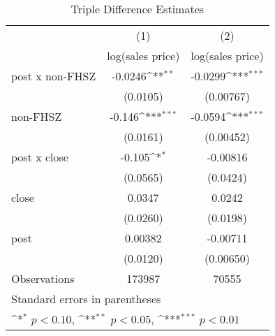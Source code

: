 \begin{table}[htbp]\centering
\def\sym#1{\ifmmode^{#1}\else\(^{#1}\)\fi}
\caption{Triple Difference Estimates\label{tabl}}
\begin{tabular}{l*{2}{c}}
\hline\hline
                    &\multicolumn{1}{c}{(1)}&\multicolumn{1}{c}{(2)}\\
                    &\multicolumn{1}{c}{log(sales price)}&\multicolumn{1}{c}{log(sales price)}\\
\hline
post x non-FHSZ     &     -0.0246\sym{**} &     -0.0299\sym{***}\\
                    &    (0.0105)         &   (0.00767)         \\
[1em]
non-FHSZ            &      -0.146\sym{***}&     -0.0594\sym{***}\\
                    &    (0.0161)         &   (0.00452)         \\
[1em]
post x close        &      -0.105\sym{*}  &    -0.00816         \\
                    &    (0.0565)         &    (0.0424)         \\
[1em]
close               &      0.0347         &      0.0242         \\
                    &    (0.0260)         &    (0.0198)         \\
[1em]
post                &     0.00382         &    -0.00711         \\
                    &    (0.0120)         &   (0.00650)         \\
\hline
Observations        &      173987         &       70555         \\
\hline\hline
\multicolumn{3}{l}{\footnotesize Standard errors in parentheses}\\
\multicolumn{3}{l}{\footnotesize \sym{*} \(p<0.10\), \sym{**} \(p<0.05\), \sym{***} \(p<0.01\)}\\
\end{tabular}
\end{table}

